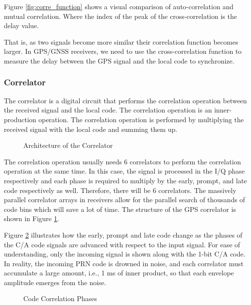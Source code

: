 Figure \ref{fig:corre_function} shows a visual comparison of auto-correlation and mutual correlation. Where the index of the peak of the cross-correlation is the delay value.

That is, as two signals become more similar their correlation function becomes larger. In GPS/GNSS receivers, we need to use the cross-correlation function to measure the delay between the GPS signal and the local code to synchronize.

\subsubsection{Correlator}
The correlator is a digital circuit that performs the correlation operation between the received signal and the local code. The correlation operation is an inner-production operation. The correlation operation is performed by multiplying the received signal with the local code and summing them up.

\begin{figure}[!htbp]
    \centering
    
    \caption{Architecture of the Correlator}
    \label{fig:correlator}
\end{figure}

The correlation operation usually needs 6 correlators to perform the correlation operation at the same time. In this case, the signal is processed in the I/Q phase respectively and each phase is required to multiply by the early, prompt, and late code respectively as well. Therefore, there will be 6 correlators. The massively parallel correlator arrays in receivers allow for the parallel search of thousands of code bins which will save a lot of time\cite{RN178}. The structure of the GPS correlator is shown in Figure \ref{fig:correlator}.

Figure \ref{fig:code_delay} illustrates how the early, prompt and late code change as the phases of the C/A code signals are advanced with respect to the input signal. For ease of understanding, only the incoming signal is shown along with the 1-bit C/A code. In reality, the incoming PRN code is drowned in noise, and each correlator must accumulate a large amount, i.e., 1 ms of inner product, so that each envelope amplitude emerges from the noise.

\begin{figure}[!htbp]
    \centering
    
    \caption{Code Correlation Phases}
    \label{fig:code_delay}
\end{figure}

